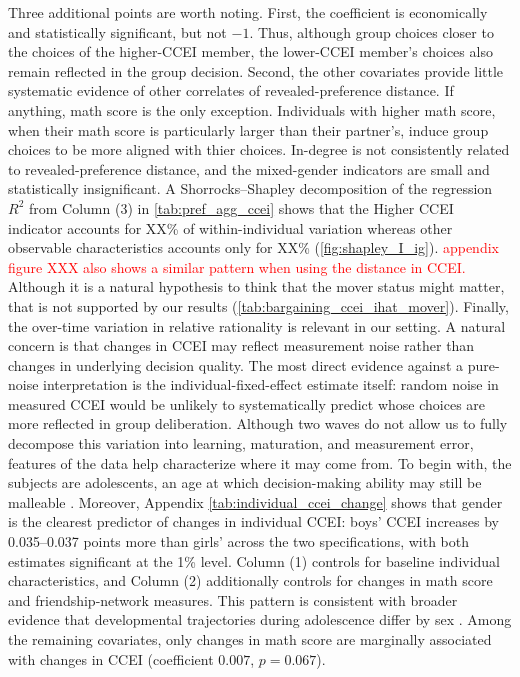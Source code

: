 \documentclass[11 pt]{article}
\begin{document}
Three additional points are worth noting. First, the coefficient is economically and statistically significant, but not $-1$. Thus, although group choices closer to the choices of the higher-CCEI member, the lower-CCEI member's choices also remain reflected in the group decision. Second, the other covariates provide little systematic evidence of other correlates of revealed-preference distance. If anything, math score is the only exception. Individuals with higher math score, when their math score is particularly larger than their partner's, induce group choices to be more aligned with thier choices. In-degree is not consistently related to revealed-preference distance, and the mixed-gender indicators are small and statistically insignificant. A Shorrocks--Shapley decomposition of the regression $R^2$ from Column (3) in \autoref{tab:pref_agg_ccei} shows that the Higher CCEI indicator accounts for XX\% of within-individual variation whereas other observable characteristics accounts only for XX\% (\autoref{fig:shapley_I_ig}). \textcolor{red}{appendix figure XXX also shows a similar pattern when using the distance in CCEI.} Although it is a natural hypothesis to think that the mover status might matter, that is not supported by our results (\autoref{tab:bargaining_ccei_ihat_mover}).
 Finally, the over-time variation in relative rationality is relevant in our setting. A natural concern is that changes in CCEI may reflect measurement noise rather than changes in underlying decision quality. The most direct evidence against a pure-noise interpretation is the individual-fixed-effect estimate itself: random noise in measured CCEI would be unlikely to systematically predict whose choices are more reflected in group deliberation. Although two waves do not allow us to fully decompose this variation into learning, maturation, and measurement error, features of the data help characterize where it may come from. To begin with, the subjects are adolescents, an age at which decision-making ability may still be malleable \citep{kim2018role}. Moreover, Appendix \autoref{tab:individual_ccei_change} shows that gender is the clearest predictor of changes in individual CCEI: boys' CCEI increases by 0.035--0.037 points more than girls' across the two specifications, with both estimates significant at the 1\% level. Column (1) controls for baseline individual characteristics, and Column (2) additionally controls for changes in math score and friendship-network measures. This pattern is consistent with broader evidence that developmental trajectories during adolescence differ by sex \citep{lenroot2010sex}. Among the remaining covariates, only changes in math score are marginally associated with changes in CCEI (coefficient $0.007$, $p=0.067$).
\end{document}
